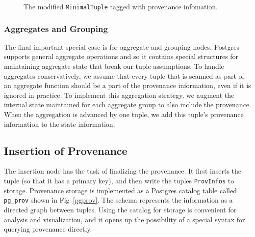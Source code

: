 \begin{figure}
  \centering
  \label{mintup}
  \caption {The modified \texttt{MinimalTuple} tagged with provenance infomation.}
\end{figure}





\subsubsection{Aggregates and Grouping}

The final important special case is for aggregate and grouping nodes. Postgres supports general aggregate operations and so it contains special structures for maintaining aggregate state that break our tuple assumptions. To handle aggregates conservatively, we assume that every tuple that is scanned as part of an  aggregate function should be a part of the provenance information, even if it is ignored in practice. To implement this aggregation strategy, we augment the internal state maintained for each aggregate group to also include the provenance. When the aggregation is advanced by one tuple, we add this tuple's provenance information to the state information. 


\subsection{Insertion of Provenance}

The insertion node has the task of finalizing the provenance. It first inserts the tuple (so that it has a primary key), and then write the tuples \texttt{ProvInfos} to storage. Provenance storage is implemented as a Postgres catalog table called \texttt{pg\_prov} shown in Fig~\ref{pgprov}. The schema represents the information as a directed graph between tuples. Using the catalog for storage is convenient for analysis and visualization, and it opens up the possibility of a special syntax for querying provenance directly. 


